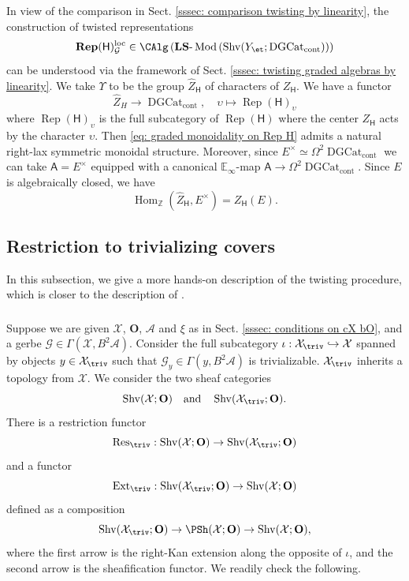 \documentclass[10pt]{amsart}
\newcommand{\sssec}{\subsubsection}
\theoremstyle{remark}
\newcommand{\te}{\text}
\newcommand{\wh}{\widehat}
\newcommand{\E}{\mathbb{E}}
\newcommand{\Z}{\mathbb{Z}}
\newcommand{\on}{\operatorname}
\newcommand{\cA}{\mathcal{A}}
\newcommand{\cG}{\mathcal{G}}
\newcommand{\cX}{\mathcal{X}}
\newcommand{\DGcat}{\on{DGCat}_{\on{cont}}}
\newcommand{\lMod}{\text{-}\on{Mod}}
\newcommand{\Rep}{\on{Rep}}
\newcommand{\Shv}{\on{Shv}}
\DeclareMathOperator{\Hom}{Hom}
\newcommand{\bO}{\mathbf{O}}
\newcommand{\sfA}{\mathsf{A}}
\begin{document}
\sssec{}\label{sssec: comparison twist of Rep H}
In view of the comparison in Sect. \ref{sssec: comparison twisting by linearity}, the construction of twisted representations
\[\mathbf{Rep}(\mathsf{H})^{\on{loc}}_{\cG}\in \CAlg\left(\mathbf{LS}\lMod\left(\Shv(Y_{\et};\DGcat)\right)\right)\]
can be understood via the framework of Sect. \ref{sssec: twisting graded algebras by linearity}. We take $\Upsilon$ to be the group $\wh{Z}_{\mathsf{H}}$ of characters of $Z_{\mathsf{H}}$. We have a functor
\begin{equation}\label{eq: graded monoidality on Rep H}
    \wh{Z}_H\rightarrow \DGcat,\quad \upsilon\mapsto \Rep(\mathsf{H})_{\upsilon}
\end{equation}
where $\Rep(\mathsf{H})_{\upsilon}$ is the full subcategory of $\Rep(\mathsf{H})$ where the center $Z_{\mathsf{H}}$ acts by the character $\upsilon$. Then \eqref{eq: graded monoidality on Rep H} admits a natural right-lax symmetric monoidal structure. Moreover, since $E^{\times}\simeq \Omega^2\DGcat$ we can take $\sfA=E^{\times}$ equipped with a canonical $\E_{\infty}$-map $\sfA\rightarrow \Omega^2\DGcat$. Since $E$ is algebraically closed, we have 
\[\Hom_{\Z}(\wh{Z}_{\mathsf{H}},E^{\times})= Z_{\mathsf{H}}(E).\]

\subsection{Restriction to trivializing covers}\label{ssec: restriction to triv}
In this subsection, we give a more hands-on description of the twisting procedure, which is closer to the description of \cite[Sect. 1.7]{GL}.

\sssec{}
Suppose we are given $\cX$, $\bO$, $\cA$ and $\xi$ as in Sect. \ref{sssec: conditions on cX bO}, and a gerbe $\cG\in \Gamma(\cX, B^2\cA)$.
Consider the full subcategory $\iota:\cX_{\triv}\hookrightarrow \cX$
spanned by objects $y\in \cX_{\triv}$ such that $\cG_y\in \Gamma(y,B^2\cA)$ is trivializable. $\cX_{\triv}$ inherits a topology from $\cX$. We consider the two sheaf categories
\[\Shv(\cX;\bO) \quad \te{and} \quad \Shv(\cX_{\triv};\bO).\]
There is a restriction functor
\begin{equation}\label{eq: Res triv general}
    \on{Res}_{\triv}:\Shv(\cX;\bO)\rightarrow \Shv(\cX_{\triv};\bO)
\end{equation}
and a functor
\begin{equation}\label{eq: Ext triv general}
    \on{Ext}_{\triv}:\Shv(\cX_{\triv};\bO)\rightarrow \Shv(\cX;\bO)
\end{equation}
defined as a composition
\begin{equation*}
    \Shv(\cX_{\triv};\bO)\rightarrow\PSh(\cX;\bO)\rightarrow \Shv(\cX;\bO),
\end{equation*}
where the first arrow is the right-Kan extension along the opposite of $\iota$, and the second arrow is the sheafification functor. We readily check the following. 
\end{document}
